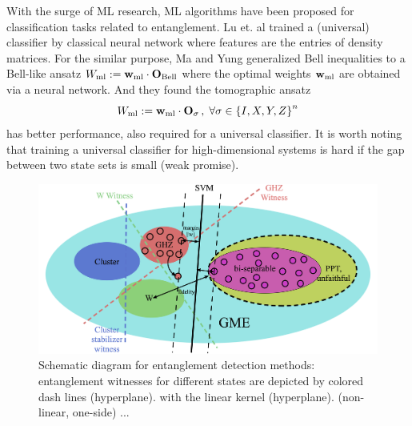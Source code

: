 \documentclass[
aps,
pra,
twocolumn,
floatfix,
]{revtex4-2}
\theoremstyle{plain}
\theoremstyle{definition}
\newcommand{\ew}{W}
\newcommand{\pob}{O}
\newcommand{\ml}{\text{ml}}
\newcommand{\bellineq}{\textup{Bell}}
\newcommand{\sx}{\hat{\sigma}_x}
\newcommand{\sy}{\hat{\sigma}_y}
\newcommand{\sz}{\hat{\sigma}_z}
\begin{document}
With the surge of ML research, ML algorithms have been proposed for classification tasks related to entanglement.
Lu et. al \cite{luSeparabilityEntanglementClassifierMachine2018} 
trained a (universal)  classifier by classical neural network
where features are the entries of density matrices.
For the similar purpose, Ma and Yung \cite{maTransformingBellInequalities2018} generalized Bell inequalities to a Bell-like ansatz $\ew_{\ml}:=\vbw_{\ml}\cdot\vb{\pob}_{\bellineq}$ where the optimal weights $\vbw_{\ml}$ are obtained via a neural network.
And they found the tomographic ansatz
\begin{equation}
	\ew_{\ml} := 
	\vbw_{\ml} \cdot \vb{\pob}_{\sigma} \, , \; \forall \sigma \in  \qty{I,X,Y,Z}^n
	\label{eq:tomographic_ansatz}
\end{equation}
has better performance, 
also required \cite{luTomographyNecessaryUniversal2016} for a universal  classifier.
It is worth noting that training a universal classifier for high-dimensional systems is hard if the gap between two state sets is small (weak promise).

\begin{figure}[!ht]
	\centering
		\centering
		\includegraphics[width=.8\linewidth]{schematic_entangle.png}
	\caption{Schematic diagram for entanglement detection methods: entanglement witnesses for different states are depicted by colored dash lines (hyperplane).  with the linear kernel (hyperplane).  (non-linear, one-side) ... }
	\label{fig:entangle}
\end{figure}
\end{document}
